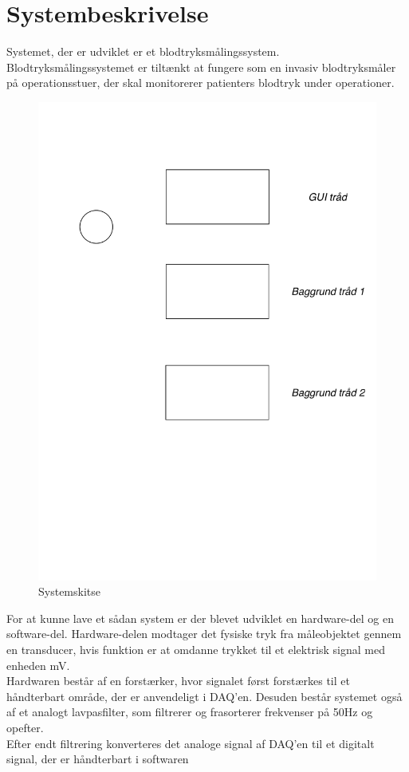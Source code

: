 \chapter{Systembeskrivelse}
Systemet, der er udviklet er et blodtryksmålingssystem. Blodtryksmålingssystemet er tiltænkt at fungere som en invasiv blodtryksmåler på operationsstuer, der skal monitorerer patienters blodtryk under operationer.\\

\begin{figure}[H]
	\centering
	\includegraphics[width=1\textwidth]{Figurer/Systembeskrivelse}
	\caption{Systemskitse}
	\label{opstilling}
\end{figure} 
For at kunne lave et sådan system er der blevet udviklet en hardware-del og en software-del. 
Hardware-delen modtager det fysiske tryk fra måleobjektet gennem en transducer, hvis funktion er at omdanne trykket til et elektrisk signal med enheden mV.\\
Hardwaren består af en forstærker, hvor signalet først forstærkes til et håndterbart område, der er anvendeligt i DAQ'en. Desuden består systemet også af et analogt lavpasfilter, som filtrerer og frasorterer frekvenser på 50Hz og opefter.\\
Efter endt filtrering konverteres det analoge signal af DAQ'en til et digitalt signal, der er håndterbart i softwaren\\[1ex]

